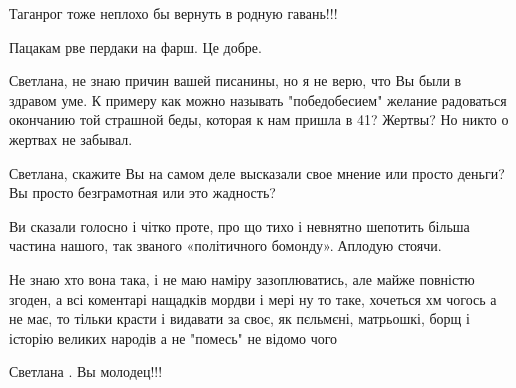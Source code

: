 \begin{itemize}
Таганрог тоже неплохо бы вернуть в родную гавань!!!🤔

 
Пацакам рве пердаки на фарш. Це добре.

 

Светлана, не знаю причин вашей писанины, но я не верю, что Вы были в здравом
уме. К примеру как можно называть "победобесием" желание радоваться окончанию
той страшной беды, которая к нам пришла в 41? Жертвы? Но никто о жертвах не
забывал.

Светлана, скажите Вы на самом деле высказали свое мнение или просто деньги? Вы
просто безграмотная или это жадность?


 

Ви сказали голосно і чітко проте, про що тихо і невнятно шепотить більша
частина нашого, так званого «політичного бомонду».👏Аплодую стоячи.

 
Не знаю хто вона така, і не маю наміру зазоплюватись, але майже повністю згоден, а всі коментарі нащадків мордви і мері ну то таке, хочеться хм чогось а не має, то тільки красти і видавати за своє, як пєльмєні, матрьошкі, борщ і історію великих народів а не "помесь" не відомо чого

 
Светлана . Вы молодец!!!

 


\end{itemize}
